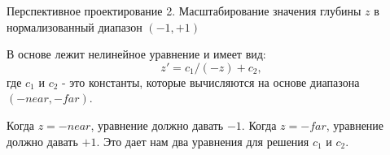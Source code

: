 \documentclass{beamer}
\begin{document}
	\begin{frame}{Перспективное проектирование}
		2. Масштабирование значения глубины $z$ в нормализованный диапазон $(-1, +1)$
		
В основе лежит нелинейное уравнение и имеет вид: 
\[
	z' = c_1/(-z) + c_2, 
\]
где $c_1$ и $c_2$ - это константы, которые вычисляются на основе диапазона $(-near, -far)$. 

Когда $z = -near$, уравнение должно давать $-1$. 
Когда $z = -far$, уравнение должно давать $+1$. 
Это дает нам два уравнения для решения $c_1$ и $c_2$.

\end{frame}
\end{document}
